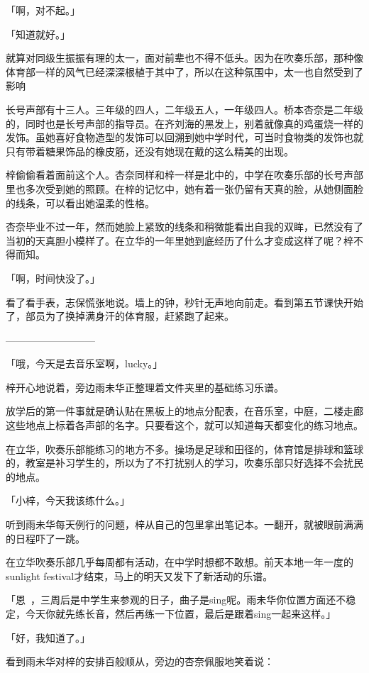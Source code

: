 \documentclass[UTF8]{ctexart}
\begin{document}
    「啊，对不起。」

    「知道就好。」

    就算对同级生振振有理的太一，面对前辈也不得不低头。因为在吹奏乐部，那种像体育部一样的风气已经深深根植于其中了，所以在这种氛围中，太一也自然受到了影响

    长号声部有十三人。三年级的四人，二年级五人，一年级四人。桥本杏奈是二年级的，同时也是长号声部的指导员。在齐刘海的黑发上，别着就像真的鸡蛋烧一样的发饰。虽她喜好食物造型的发饰可以回溯到她中学时代，可当时食物类的发饰也就只有带着糖果饰品的橡皮筋，还没有她现在戴的这么精美的出现。

    梓偷偷看着面前这个人。杏奈同样和梓一样是北中的，中学在吹奏乐部的长号声部里也多次受到她的照顾。在梓的记忆中，她有着一张仍留有天真的脸，从她侧面脸的线条，可以看出她温柔的性格。

    杏奈毕业不过一年，然而她脸上紧致的线条和稍微能看出自我的双眸，已然没有了当初的天真胆小模样了。在立华的一年里她到底经历了什么才变成这样了呢？梓不得而知。

    「啊，时间快没了。」

    看了看手表，志保慌张地说。墙上的钟，秒针无声地向前走。看到第五节课快开始了，部员为了换掉满身汗的体育服，赶紧跑了起来。

    —————————

    「哦，今天是去音乐室啊，lucky。」

    梓开心地说着，旁边雨未华正整理着文件夹里的基础练习乐谱。

    放学后的第一件事就是确认贴在黑板上的地点分配表，在音乐室，中庭，二楼走廊这些地点上标着各声部的名字。只要看这个，就可以知道每天都变化的练习地点。

    在立华，吹奏乐部能练习的地方不多。操场是足球和田径的，体育馆是排球和篮球的，教室是补习学生的，所以为了不打扰别人的学习，吹奏乐部只好选择不会扰民的地点。

    「小梓，今天我该练什么。」

    听到雨未华每天例行的问题，梓从自己的包里拿出笔记本。一翻开，就被眼前满满的日程吓了一跳。

    在立华吹奏乐部几乎每周都有活动，在中学时想都不敢想。前天本地一年一度的sunlight festival才结束，马上的明天又发下了新活动的乐谱。

    「恩~，三周后是中学生来参观的日子，曲子是sing呢。雨未华你位置方面还不稳定，今天你就先练长音，然后再练一下位置，最后是跟着sing一起来这样。」

    「好，我知道了。」

    看到雨未华对梓的安排百般顺从，旁边的杏奈佩服地笑着说：
\end{document}
